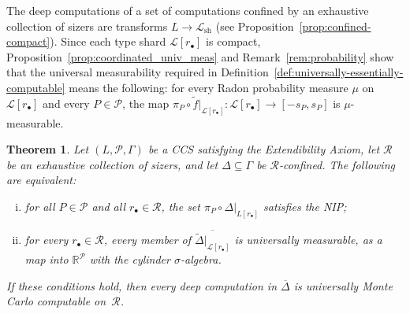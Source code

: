 \documentclass[psamsfonts]{amsart}
\newtheorem{thm}{Theorem}[section]
\theoremstyle{definition}
\theoremstyle{remark}
\newcommand{\sh}{\text{sh}}
\numberwithin{equation}{section}
\begin{document}
The deep computations of a set of computations confined by an exhaustive collection of sizers are transforms $L\to\mathcal{L}_{\sh}$ (see Proposition~\ref{prop:confined-compact}).
Since each type shard $\mathcal{L}[r_\bullet]$ is compact, Proposition~\ref{prop:coordinated_univ_meas} and Remark~\ref{rem:probability} show that the universal measurability required in Definition~\ref{def:universally-essentially-computable} means the following: for every Radon probability measure $\mu$ on $\mathcal{L}[r_\bullet]$ and every $P\in\mathcal{P}$, the map $\pi_P\circ \tilde f|_{\mathcal{L}[r_{\bullet}]}\colon\mathcal{L}[r_\bullet]\to [-s_P,s_P]$ is $\mu$-measurable.

\begin{thm}
  \label{thm:NIP-Monte-Carlo}
  Let $(L,\mathcal{P},\Gamma)$ be a CCS satisfying the Extendibility Axiom, let $\mathscr{R}$ be an exhaustive collection of sizers, and let $\Delta\subseteq\Gamma$ be $\mathscr{R}$-confined.
  The following are equivalent:
  \begin{enumerate}[(i)]
  \item
    for all $P\in\mathcal{P}$ and all $r_{\bullet}\in \mathscr{R}$, the set $\pi_P\circ\Delta|_{L[r_\bullet]}$ satisfies the NIP;
  \item
    for every $r_\bullet\in\mathscr{R}$, every member of $\overline{\tilde\Delta|_{\mathcal{L}[r_\bullet]}}$ is universally measurable, as a map into $\mathbb{R}^{\mathcal{P}}$ with the cylinder $\sigma$-algebra.
  \end{enumerate}
  If these conditions hold, then every deep computation in $\overline{\Delta}$ is universally Monte Carlo computable on~$\mathscr{R}$.
\end{thm}
\end{document}

